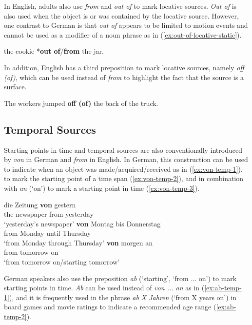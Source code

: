 \documentclass[lucida]{sp} %
\begin{document}
In English, adults also use \textit{from} and \textit{out of} to mark locative sources. \textit{Out of} is also used when the object is or was contained by the locative source. However, one contrast to German is that \textit{out of} appears to be limited to motion events and cannot be used as a modifier of a noun phrase as in (\ref{ex:out-of-locative-static}).
\begin{exe}
\ex \label{ex:out-of-locative-static} the cookie *\textbf{out of}/\textbf{from} the jar.
\end{exe}
In addition, English has a third preposition to mark locative sources, namely \textit{off (of)}, which can be used instead of \textit{from} to highlight the fact that the source is a surface.

\begin{exe}
\ex The workers jumped \textbf{off (of)} the back of the truck.
\end{exe}

\subsection{Temporal Sources}

Starting points in time and temporal sources are also conventionally introduced by \textit{von} in German and \textit{from} in English. In German, this construction can be used to indicate when an object was made/acquired/received as in (\ref{ex:von-temp-1}), to mark the starting point of a time span (\ref{ex:von-temp-2}), and in combination with \textit{an} (`{on}') to mark a starting point in time (\ref{ex:von-temp-3}).

\begin{exe}
\ex \label{ex:von-temp-1} \gll die Zeitung \textbf{von} gestern \\
the newspaper from yesterday \\
`yesterday's newspaper'
\ex \label{ex:von-temp-2} \gll \textbf{von} Montag bis Donnerstag \\
from Monday until Thursday \\
`from Monday through Thursday'
\ex \label{ex:von-temp-3} \gll \textbf{von} morgen an \\
from tomorrow on \\
`from tomorrow on/starting tomorrow'
\end{exe}
German speakers also use the preposition \textit{ab} (`starting', `from ... on') to mark starting points in time. \textit{Ab} can be used instead of \textit{von ... an} as in (\ref{ex:ab-temp-1}), and it is frequently used in the phrase \textit{ab X Jahren} (`from X years on') in board games and movie ratings to indicate a recommended age range (\ref{ex:ab-temp-2}).
\end{document}
